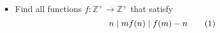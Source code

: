 \documentclass[11pt]{scrartcl}
\begin{document}
\begin{itemize}[label=,itemsep=0.4em,leftmargin=0em]
\begin{comment}
        Let $|y_{1}|=|y_{2}|$ be two complex numbers. Then using injectivity of $f$ we get
        $P(x,y_{1}), P(x,y_{2}) \implies y_{1}f(y_{1}) = y_{2}f(y_{2})$. Let $y_{1} =y$ and $y_{2} = |y|$ we get that
        $$f(y) = \dfrac{\bar{y}}{|y|}f(|y|)\; \;\;\;(1).$$
        So it suffices to find $f$ on the real line $\mathbb{R}$. By applying $f()$ both sides of $P(x,y)$ we get $f(x+|y|^2)=f(x)+yf(y)$. By inserting $x=0$ in this equation and rewriting the equation we get
        $f(x+|y|^{2})=f(x)+f(|y|^{2})$. Then for any two positive real numbers $x,y$ we have
        $$f(x+y)=f(x)+f(y) .$$We know that $|f(x)|=|x|$ for any complex number $x$. Using triangle inequality, for positive reals $a,b$ we have
        $$a+b = |a+b| = |f(a+b)| = |f(a)+f(b)| \leq |f(a)| +  |f(b)| = |a| + |b| = a+b.$$The equality case of triangle inequality gives us that $f(x)=xf(1)$ for all positive real $x$. So $f(|x|)= |x|f(1)$ for any $x\in \mathbb{C}$. This with $(1)$ gives us
        $$\forall y\in \mathbb{C}:\;f(y) = f(1)\cdot \bar{y}.$$And so $\boxed{f(y)=e^{i\theta}\overline y\quad\forall y\in\mathbb C}$, which indeed fits, whatever is $\theta\in[0,2\pi)$.
    \end{comment}
    \item \begin{btvn}
        Find all functions $f: \mathbb{Z^+} \to \mathbb{Z^+}$ that satisfy
        \[
             n\mid m \lra f(n) \mid f(m) - n \tag{1}
        \]
    \end{btvn}
    \begin{comment}
        Denote $P(m,n)$ as the substitution into $(1)$. 
        
        \vocab{Claim 1:} $n \mid m \iff f(n) \mid f(m)$.
        \begin{pro}
            Substituting $P(n,n)$ we get 
                \[f(n) \mid f(n) - n \ra f(n) \mid n, \forall n \in \mathbb{Z^+} \tag{2}
                \]
                From this we deduce 
                \[
                n \mid m \iff f(n) \mid f(m) \tag{3}
                \] 
        \end{pro}
        \vocab{Claim 2:} $f(p) = p, \forall p \in \mathbb{P}$.
        \begin{pro}
            From $(2)$ with $n = 1$, we get $f(1) \mid 1 \ra f(1) = 1$. 
        
        Consider any prime number $p \in \mathbb{P}$. From $(2)$ with $n = p$, we get 
        \[
            f(p) \mid p, \forall p \in \mathbb{P}
        \]
        Hence $f(p) = \{1, p\}, \forall p \in \mathbb{P}$. We will prove that $f$ is injective. Assume there exist $a$ and $b$ such that $f(a) = f(b)$ with $a \mid b$ and $a < b$. From $(3)$, substituting $P(b,a)$, we get $a = b$, which is a contradiction. Therefore, $f$ is injective. Since we already have $f(1) = 1$, we conclude that $f(p) = p, \forall p \in \mathbb{P}$.
        \end{pro}
        \vocab{Claim 3:} $f(p^k) = p^k, \forall k \in \mathbb{N}, p \in \mathbb{P}$
        \begin{pro}
            We will prove this by induction. For $k = 1$, it is obviously true.
            

\end{comment}
\end{itemize}
\end{document}
